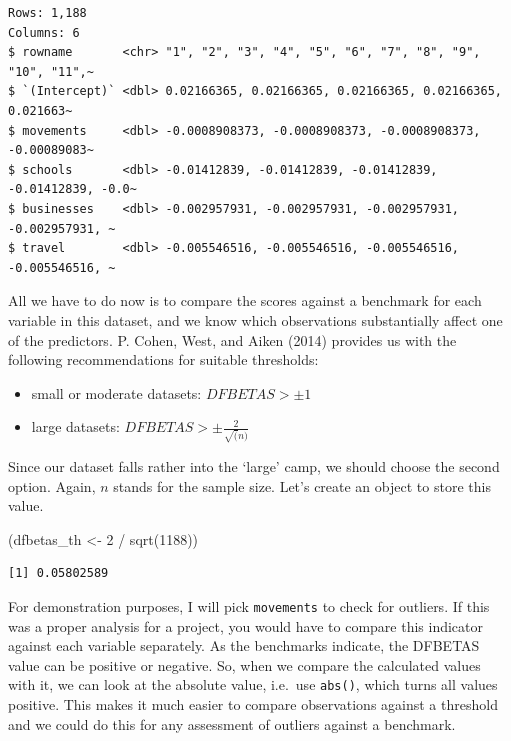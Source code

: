 \documentclass[
  letterpaper,
]{krantz}
\makeatletter
\newenvironment{Shaded}{\begin{snugshade}}{\end{snugshade}}
\newcommand{\DecValTok}[1]{\textcolor[rgb]{0.68,0.00,0.00}{#1}}
\newcommand{\FunctionTok}[1]{\textcolor[rgb]{0.28,0.35,0.67}{#1}}
\newcommand{\NormalTok}[1]{\textcolor[rgb]{0.00,0.23,0.31}{#1}}
\newcommand{\OtherTok}[1]{\textcolor[rgb]{0.00,0.23,0.31}{#1}}
\newcommand{\SpecialCharTok}[1]{\textcolor[rgb]{0.37,0.37,0.37}{#1}}
\newenvironment{kframe}{%
\medskip{}
\setlength{\fboxsep}{.8em}
 \def\at@end@of@kframe{}%
 \ifinner\ifhmode%
  \def\at@end@of@kframe{\end{minipage}}%
  \begin{minipage}{\columnwidth}%
 \fi\fi%
 \def\FrameCommand##1{\hskip\@totalleftmargin \hskip-\fboxsep
 \colorbox{shadecolor}{##1}\hskip-\fboxsep
     \hskip-\linewidth \hskip-\@totalleftmargin \hskip\columnwidth}%
 \MakeFramed {\advance\hsize-\width
   \@totalleftmargin\z@ \linewidth\hsize
   \@setminipage}}%
 {\par\unskip\endMakeFramed%
 \at@end@of@kframe}
\renewenvironment{Shaded}{\begin{kframe}}{\end{kframe}}
\makeatother
\begin{document}
\begin{verbatim}
Rows: 1,188
Columns: 6
$ rowname       <chr> "1", "2", "3", "4", "5", "6", "7", "8", "9", "10", "11",~
$ `(Intercept)` <dbl> 0.02166365, 0.02166365, 0.02166365, 0.02166365, 0.021663~
$ movements     <dbl> -0.0008908373, -0.0008908373, -0.0008908373, -0.00089083~
$ schools       <dbl> -0.01412839, -0.01412839, -0.01412839, -0.01412839, -0.0~
$ businesses    <dbl> -0.002957931, -0.002957931, -0.002957931, -0.002957931, ~
$ travel        <dbl> -0.005546516, -0.005546516, -0.005546516, -0.005546516, ~
\end{verbatim}

All we have to do now is to compare the scores against a benchmark for
each variable in this dataset, and we know which observations
substantially affect one of the predictors. P. Cohen, West, and Aiken
(2014) provides us with the following recommendations for suitable
thresholds:

\begin{itemize}
\item
  small or moderate datasets: \(DFBETAS > \pm 1\)
\item
  large datasets: \(DFBETAS > \pm\frac{2}{\sqrt(n)}\)
\end{itemize}

Since our dataset falls rather into the `large' camp, we should choose
the second option. Again, \(n\) stands for the sample size. Let's create
an object to store this value.

\begin{Shaded}
\begin{Highlighting}[]
\NormalTok{(dfbetas\_th }\OtherTok{\textless{}{-}} \DecValTok{2} \SpecialCharTok{/} \FunctionTok{sqrt}\NormalTok{(}\DecValTok{1188}\NormalTok{))}
\end{Highlighting}
\end{Shaded}

\begin{verbatim}
[1] 0.05802589
\end{verbatim}

For demonstration purposes, I will pick \texttt{movements} to check for
outliers. If this was a proper analysis for a project, you would have to
compare this indicator against each variable separately. As the
benchmarks indicate, the DFBETAS value can be positive or negative. So,
when we compare the calculated values with it, we can look at the
absolute value, i.e.~use \texttt{abs()}, which turns all values
positive. This makes it much easier to compare observations against a
threshold and we could do this for any assessment of outliers against a
benchmark.
\end{document}
